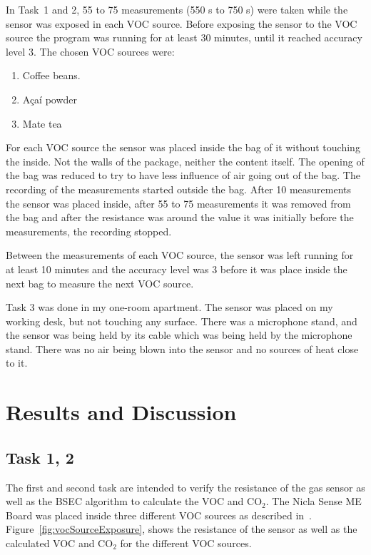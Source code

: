 \documentclass[DIV=14]{scrartcl}
\begin{document}
    In Task~1 and 2, 55 to 75 measurements (550 \si{\second} to 750 \si{\second}) were taken while the sensor was exposed in each VOC source.
    Before exposing the sensor to the VOC source the program was running for at least 30 minutes, until it reached accuracy level 3.
    The chosen VOC sources were:

    \begin{enumerate}
        \item Coffee beans.
        \item A\c{c}a\'i powder
        \item Mate tea
    \end{enumerate}

    For each VOC source the sensor was placed inside the bag of it without touching the inside.
    Not the walls of the package, neither the content itself.
    The opening of the bag was reduced to try to have less influence of air going out of the bag.
    The recording of the measurements started outside the bag.
    After 10 measurements the sensor was placed inside, after 55 to 75 measurements it was removed from the bag
    and after the resistance was around the value it was initially before the measurements, the recording stopped.

    Between the measurements of each VOC source, the sensor was left running for at least 10 minutes and the accuracy level
    was 3 before it was place inside the next bag to measure the next VOC source.

    Task 3 was done in my one-room apartment.
    The sensor was placed on my working desk, but not touching any surface.
    There was a microphone stand, and the sensor was being held by its cable which was being held by the microphone stand.
    There was no air being blown into the sensor and no sources of heat close to it.

    \section{Results and Discussion}\label{sec:results-and-discussion}

    \subsection*{Task 1, 2}

    The first and second task are intended to verify the resistance of the gas sensor as well as the BSEC algorithm to
    calculate the VOC and $\mathrm{CO_2}$.
    The Nicla Sense ME Board was placed inside three different VOC sources as described in~.
    Figure~\ref{fig:vocSourceExposure}, shows the resistance of the sensor as well as the calculated VOC and $\mathrm{CO_2}$ for
    the different VOC sources.
\end{document}

